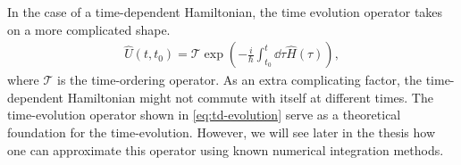         In the case of a time-dependent Hamiltonian, the time evolution operator
        takes on a more complicated shape.
        \begin{align}
            \hat{U}(t, t_0) =
            \mathcal{T}\exp(
                -\frac{i}{\hslash} \int_{t_0}^{t} \dd\tau
                \hat{H}(\tau)
            ),
            \label{eq:td-evolution}
        \end{align}
        where $\mathcal{T}$ is the time-ordering operator.
        As an extra complicating factor, the time-dependent Hamiltonian might
        not commute with itself at different times.
        The time-evolution operator shown in \autoref{eq:td-evolution} serve as
        a theoretical foundation for the time-evolution.
        However, we will see later in the thesis how one can approximate this
        operator using known numerical integration methods.

